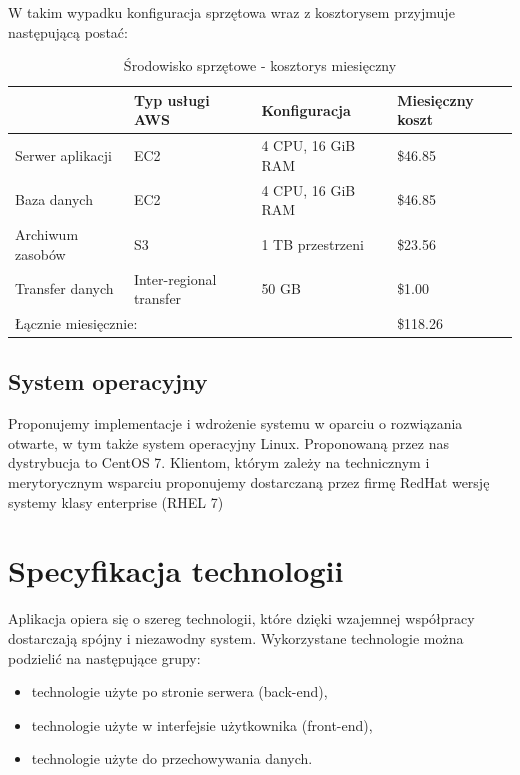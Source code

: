 \documentclass[12pt, oneside, final]{report}
\begin{document}
W takim wypadku konfiguracja sprzętowa wraz z kosztorysem przyjmuje następującą postać:

\begin{table}[]
\centering
\caption{Środowisko sprzętowe - kosztorys miesięczny }
\begin{tabular}{|l|l|l|l|}
\hline
 & Typ usługi AWS & Konfiguracja & Miesięczny koszt \\ \hline
Serwer aplikacji 		 & EC2             & 4 CPU, 16 GiB RAM  & \$46.85                 \\ \hline
Baza danych &              EC2            &   4 CPU, 16 GiB RAM             &          \$46.85     \\ \hline
Archiwum zasobów &               S3           &   1 TB przestrzeni           &     \$23.56             \\ \hline
 Transfer danych &         Inter-regional transfer  &       50 GB       &         \$1.00         \\ \hline
 \multicolumn{3}{|l|}{Łącznie miesięcznie: } & \$118.26 \\ \hline
\end{tabular}
\end{table}



\section{System operacyjny}
Proponujemy implementacje i wdrożenie systemu w oparciu o rozwiązania otwarte, w tym także system operacyjny Linux. Proponowaną przez nas dystrybucja to CentOS 7. Klientom, którym zależy na technicznym i merytorycznym wsparciu proponujemy dostarczaną przez firmę RedHat wersję systemy klasy enterprise (RHEL 7)

\chapter{Specyfikacja technologii}
Aplikacja opiera się o szereg technologii, które dzięki wzajemnej współpracy dostarczają spójny i niezawodny system. Wykorzystane technologie można podzielić na następujące grupy:
\begin{itemize}
	\item technologie użyte po stronie serwera (back-end),
	\item technologie użyte w interfejsie użytkownika (front-end),
	\item technologie użyte do przechowywania danych.
\end{itemize}
\end{document}

